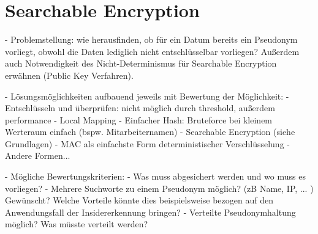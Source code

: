 \section{Searchable Encryption}

- Problemstellung: wie herausfinden, ob für ein Datum bereits ein Pseudonym vorliegt, obwohl die Daten lediglich nicht entschlüsselbar vorliegen? Außerdem auch Notwendigkeit des  Nicht-Determinismus für Searchable Encryption erwähnen (Public Key Verfahren).

- Lösungsmöglichkeiten aufbauend jeweils mit Bewertung der Möglichkeit:
  - Entschlüsseln und überprüfen: nicht möglich durch threshold, außerdem performance
  - Local Mapping
  - Einfacher Hash: Bruteforce bei kleinem Werteraum einfach (bspw. Mitarbeiternamen)
  - Searchable Encryption (siehe Grundlagen)
    - MAC als einfachste Form deterministischer Verschlüsselung
    - Andere Formen...
    
- Mögliche Bewertungskriterien:
  - Was muss abgesichert werden und wo muss es vorliegen?
  - Mehrere Suchworte zu einem Pseudonym möglich? (zB Name, IP, ... ) Gewünscht? Welche Vorteile könnte dies beispielsweise bezogen auf den Anwendungsfall der Insidererkennung bringen?
  - Verteilte Pseudonymhaltung möglich? Was müsste verteilt werden?